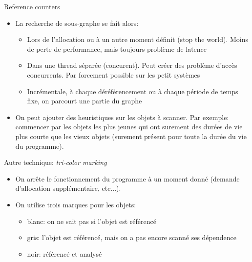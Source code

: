 \begin{frame}[fragile=singleslide]{Reference counters}
  \begin{itemize}
  \item La recherche de sous-graphe se fait alors:
    \begin{itemize}
    \item Lors de l'allocation ou  à un autre moment définit (stop the
      world). Moins de perte de performance, mais toujours problème de
      latence
    \item  Dans  une  thread  séparée  (concurent).   Peut  créer  des
      problème  d'accès concurrents.  Par  forcement possible  sur les
      petit systèmes
    \item Incrémentale,  à chaque déréférencement ou  à chaque période
      de temps fixe, on parcourt une partie du graphe
    \end{itemize}
  \item On peut ajouter des heuristiques sur les objets à scanner. Par
    exemple: commencer par les objets les plus jeunes qui ont surement
    des  durées de  vie plus  courte  que les  vieux objets  (surement
    présent pour toute la durée du vie du programme).
  \end{itemize}
\end{frame}

\begin{frame}[fragile=singleslide]{Autre technique: \emph{tri-color marking}}
  \begin{itemize}
  \item On  arrête le  fonctionnement du programme  à un  moment donné
    (demande d'allocation supplémentaire, etc...).
  \item On utilise trois marques pour les objets:
    \begin{itemize}
    \item blanc: on ne sait pas si l'objet est référencé
    \item gris: l'objet est référencé, mais on a pas encore scanné ses
      dépendence
    \item noir: référencé et analysé
    \end{itemize}
  \end{itemize}
\end{frame}

